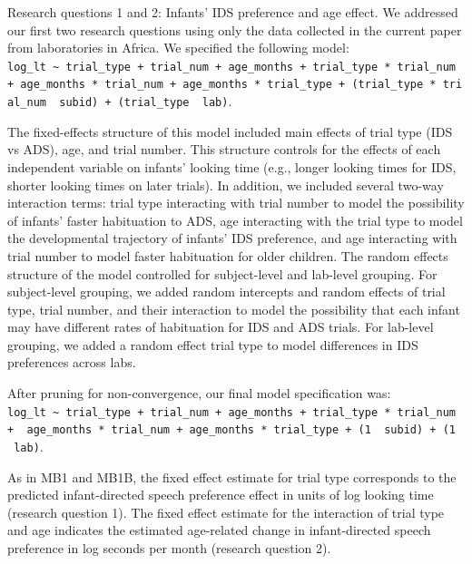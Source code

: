 \documentclass[
  ,man,floatsintext]{apa6}
\begin{document}
Research questions 1 and 2: Infants' IDS preference and age effect. We addressed our first two research questions using only the data collected in the current paper from laboratories in Africa. We specified the following model:
\texttt{log\_lt\ \textasciitilde{}\ trial\_type\ +\ trial\_num\ +\ age\_months\ +\ trial\_type\ *\ trial\_num\ +\ age\_months\ *\ trial\_num\ +\ age\_months\ *\ trial\_type\ +\ (trial\_type\ *\ trial\_num\ \textbar{}\ subid)\ +\ (trial\_type\ \textbar{}\ lab)}.

The fixed-effects structure of this model included main effects of trial type (IDS vs ADS), age, and trial number. This structure controls for the effects of each independent variable on infants' looking time (e.g., longer looking times for IDS, shorter looking times on later trials). In addition, we included several two-way interaction terms: trial type interacting with trial number to model the possibility of infants' faster habituation to ADS, age interacting with the trial type to model the developmental trajectory of infants' IDS preference, and age interacting with trial number to model faster habituation for older children. The random effects structure of the model controlled for subject-level and lab-level grouping. For subject-level grouping, we added random intercepts and random effects of trial type, trial number, and their interaction to model the possibility that each infant may have different rates of habituation for IDS and ADS trials. For lab-level grouping, we added a random effect trial type to model differences in IDS preferences across labs.

After pruning for non-convergence, our final model specification was: \texttt{log\_lt\ \textasciitilde{}\ trial\_type\ +\ trial\_num\ +\ age\_months\ +\ trial\_type\ *\ trial\_num\ +\ \ age\_months\ *\ trial\_num\ +\ age\_months\ *\ trial\_type\ +\ (1\ \textbar{}\ subid)\ +\ (1\ \textbar{}\ lab)}.

As in MB1 and MB1B, the fixed effect estimate for trial type corresponds to the predicted infant-directed speech preference effect in units of log looking time (research question 1). The fixed effect estimate for the interaction of trial type and age indicates the estimated age-related change in infant-directed speech preference in log seconds per month (research question 2).
\end{document}
